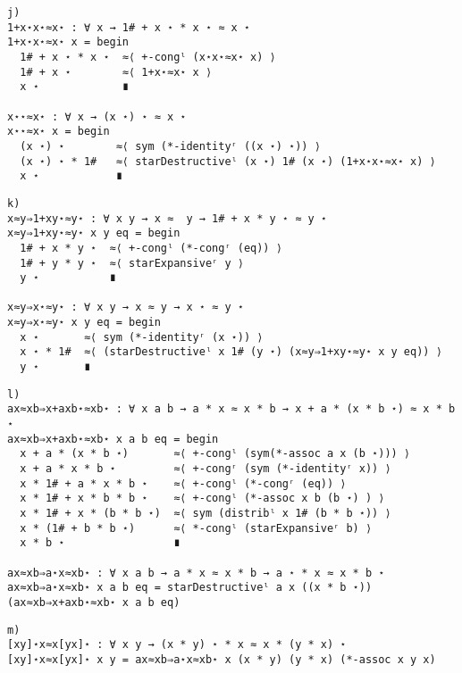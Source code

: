 \begin{Verbatim}
j)
1+x⋆x⋆≈x⋆ : ∀ x → 1# + x ⋆ * x ⋆ ≈ x ⋆
1+x⋆x⋆≈x⋆ x = begin
  1# + x ⋆ * x ⋆  ≈⟨ +-congˡ (x⋆x⋆≈x⋆ x) ⟩
  1# + x ⋆        ≈⟨ 1+x⋆≈x⋆ x ⟩
  x ⋆             ∎

x⋆⋆≈x⋆ : ∀ x → (x ⋆) ⋆ ≈ x ⋆
x⋆⋆≈x⋆ x = begin
  (x ⋆) ⋆        ≈⟨ sym (*-identityʳ ((x ⋆) ⋆)) ⟩
  (x ⋆) ⋆ * 1#   ≈⟨ starDestructiveˡ (x ⋆) 1# (x ⋆) (1+x⋆x⋆≈x⋆ x) ⟩
  x ⋆            ∎
\end{Verbatim}

\begin{Verbatim}
k)
x≈y⇒1+xy⋆≈y⋆ : ∀ x y → x ≈  y → 1# + x * y ⋆ ≈ y ⋆
x≈y⇒1+xy⋆≈y⋆ x y eq = begin
  1# + x * y ⋆  ≈⟨ +-congˡ (*-congʳ (eq)) ⟩
  1# + y * y ⋆  ≈⟨ starExpansiveʳ y ⟩
  y ⋆           ∎

x≈y⇒x⋆≈y⋆ : ∀ x y → x ≈ y → x ⋆ ≈ y ⋆
x≈y⇒x⋆≈y⋆ x y eq = begin
  x ⋆       ≈⟨ sym (*-identityʳ (x ⋆)) ⟩
  x ⋆ * 1#  ≈⟨ (starDestructiveˡ x 1# (y ⋆) (x≈y⇒1+xy⋆≈y⋆ x y eq)) ⟩
  y ⋆       ∎
\end{Verbatim}

\begin{Verbatim}
l)
ax≈xb⇒x+axb⋆≈xb⋆ : ∀ x a b → a * x ≈ x * b → x + a * (x * b ⋆) ≈ x * b ⋆
ax≈xb⇒x+axb⋆≈xb⋆ x a b eq = begin
  x + a * (x * b ⋆)       ≈⟨ +-congˡ (sym(*-assoc a x (b ⋆))) ⟩
  x + a * x * b ⋆         ≈⟨ +-congʳ (sym (*-identityʳ x)) ⟩
  x * 1# + a * x * b ⋆    ≈⟨ +-congˡ (*-congʳ (eq)) ⟩
  x * 1# + x * b * b ⋆    ≈⟨ +-congˡ (*-assoc x b (b ⋆) ) ⟩
  x * 1# + x * (b * b ⋆)  ≈⟨ sym (distribˡ x 1# (b * b ⋆)) ⟩
  x * (1# + b * b ⋆)      ≈⟨ *-congˡ (starExpansiveʳ b) ⟩
  x * b ⋆                 ∎

ax≈xb⇒a⋆x≈xb⋆ : ∀ x a b → a * x ≈ x * b → a ⋆ * x ≈ x * b ⋆
ax≈xb⇒a⋆x≈xb⋆ x a b eq = starDestructiveˡ a x ((x * b ⋆)) (ax≈xb⇒x+axb⋆≈xb⋆ x a b eq)
\end{Verbatim}

\begin{Verbatim}
m)
[xy]⋆x≈x[yx]⋆ : ∀ x y → (x * y) ⋆ * x ≈ x * (y * x) ⋆
[xy]⋆x≈x[yx]⋆ x y = ax≈xb⇒a⋆x≈xb⋆ x (x * y) (y * x) (*-assoc x y x)
\end{Verbatim}